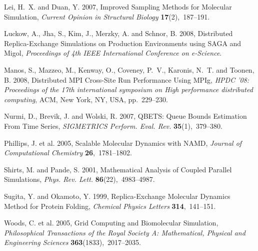 \documentclass{rspublic}
\begin{document}
\begin{thebibliography}{xx}
Lei, H.~X. and Duan, Y. 2007, {Improved Sampling Methods for Molecular
  Simulation}, {\em Current Opinion in Structural Biology} {\bf
  17}(2),~187--191.

Luckow, A., Jha, S., Kim, J., Merzky, A. and Schnor, B. 2008, {Distributed
  Replica-Exchange Simulations on Production Environments using SAGA and
  Migol}, {\em Proceedings of 4th IEEE International Conference on e-Science}.

Manos, S., Mazzeo, M., Kenway, O., Coveney, P.~V., Karonis, N.~T. and Toonen,
  B. 2008, {Distributed MPI Cross-Site Run Performance Using MPIg}, {\em HPDC
  '08: Proceedings of the 17th international symposium on High performance
  distributed computing}, ACM, New York, NY, USA, pp.~229--230.

Nurmi, D., Brevik, J. and Wolski, R. 2007, {QBETS: Queue Bounds Estimation From
  Time Series}, {\em SIGMETRICS Perform. Eval. Rev.} {\bf 35}(1),~379--380.

{Phillips, J. et al.} 2005, {Scalable Molecular Dynamics with NAMD}, {\em
  Journal of Computational Chemistry} {\bf 26},~1781--1802.

Shirts, M. and Pande, S. 2001, {Mathematical Analysis of Coupled Parallel
  Simulations}, {\em Phys. Rev. Lett.} {\bf 86}(22),~4983--4987.

Sugita, Y. and Okamoto, Y. 1999, {Replica-Exchange Molecular Dynamics Method
  for Protein Folding}, {\em Chemical Physics Letters} {\bf 314},~141--151.

{Woods, C. et al.} 2005, {Grid Computing and Biomolecular Simulation}, {\em
  Philosophical Transactions of the Royal Society A: Mathematical, Physical and
  Engineering Sciences} {\bf 363}(1833),~2017--2035.

\end{thebibliography}

%     
\end{document}
